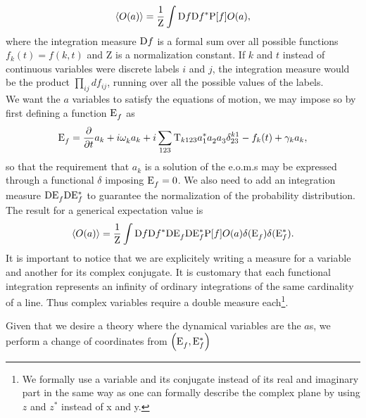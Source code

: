 \begin{equation}
    \langle O(a) \rangle = \frac{1}{\mathrm{Z}}\int \mathrm{D} f \mathrm{D} f^* \mathrm{P}[f] O(a), 
\end{equation}
where the integration measure $\mathrm{D} f$ is a formal sum over all possible functions $f_k(t) = f(k,t)$ and $\mathrm{Z}$ is a normalization constant. If $k$ and $t$ instead of continuous variables were discrete labels $i$ and $j$,
the integration measure would be the product $\prod_{ij}d f_{ij}$, running over all the possible values of the labels. \\
We want the $a$ variables to satisfy the equations of motion, we may impose so by first defining a function $\mathrm{E}_f^{}$ as
\begin{equation}
    \mathrm{E}_f^{} = \frac{\partial}{\partial t} a_k + i \omega^{}_k a_k +i \sum_{123}\mathrm{T}_{k123} a_1^*a_2^{}a_3^{} \delta^{k1}_{23} - f_k(t) + \gamma_k a_k,
    \label{Eeffe}
\end{equation}  
so that the requirement that $a_k^{}$ is a solution of the e.o.m.s may be expressed through a functional $\delta$ imposing $\mathrm{E}_f^{} = 0$. We also need to add an integration measure
$\mathrm{D} \mathrm{E}_f^{} \mathrm{D} \mathrm{E}_f^*$ to guarantee the normalization of the probability distribution. The result for a generical expectation value is
\begin{equation}
    \langle O(a) \rangle = \frac{1}{\mathrm{Z}}\int \mathrm{D} f \mathrm{D} f^* \mathrm{D} \mathrm{E}_f^{} \mathrm{D} \mathrm{E}_f^* \mathrm{P}[f] O(a)\delta(\mathrm{E}_f^{})\delta(\mathrm{E}_f^*).
\end{equation} 
It is important to notice that we are explicitely writing a measure for a variable and another for its complex conjugate. It is customary that each functional integration
represents an infinity of ordinary integrations of the same cardinality of a line. Thus complex variables require a double measure each\footnote{We formally use a variable 
and its conjugate instead of its real and imaginary part in the same way as one can formally describe the complex plane by using $z$ and $z^*$ instead of x and y.}.\\

Given that we desire a theory where the dynamical variables are the $a$s, we perform a change of coordinates from $\left(\mathrm{E}_f^{},\mathrm{E}_f^* \right)$
